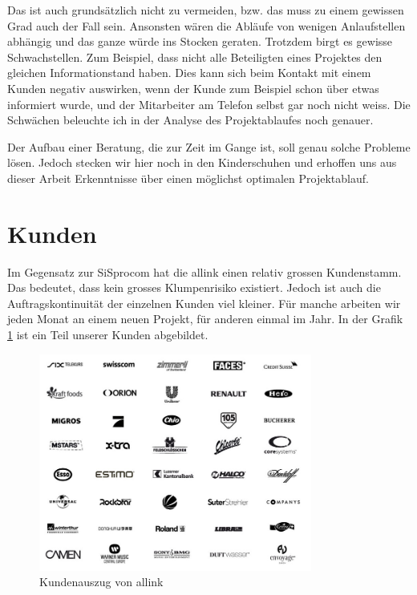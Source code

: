 Das ist auch grundsätzlich nicht zu vermeiden, bzw. das muss zu einem gewissen
Grad auch der Fall sein. Ansonsten wären die Abläufe von wenigen Anlaufstellen abhängig
und das ganze würde ins Stocken geraten. Trotzdem birgt es gewisse Schwachstellen.
Zum Beispiel, dass nicht alle Beteiligten eines Projektes den gleichen Informationstand 
haben. Dies kann sich beim Kontakt mit einem Kunden negativ auswirken, wenn der
Kunde zum Beispiel schon über etwas informiert wurde, und der Mitarbeiter am
Telefon selbst gar noch nicht weiss. Die Schwächen beleuchte ich in der Analyse
des Projektablaufes noch genauer.

Der Aufbau einer Beratung, die zur Zeit im Gange ist, soll genau solche Probleme
lösen. Jedoch stecken wir hier noch in den Kinderschuhen und erhoffen uns aus
dieser Arbeit Erkenntnisse über einen möglichst optimalen Projektablauf.

\section{Kunden}
Im Gegensatz zur SiSprocom hat die allink einen relativ grossen Kundenstamm.
Das bedeutet, dass kein grosses Klumpenrisiko existiert. Jedoch ist auch
die Auftragskontinuität der einzelnen Kunden viel kleiner. Für manche arbeiten
wir jeden Monat an einem neuen Projekt, für anderen einmal im Jahr.
In der Grafik \ref{pic:kundenauszug} ist ein Teil unserer Kunden abgebildet.

\begin{figure}[htbp]
\begin{center}
\includegraphics[width=0.8\textwidth,angle=0]{./bilder/kundenauszug.jpg}
\caption{Kundenauszug von allink}
\label{pic:kundenauszug}
\end{center}
\end{figure}

